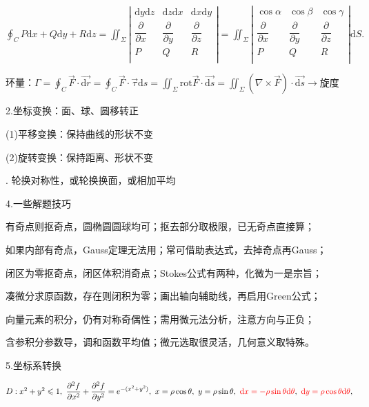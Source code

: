 \documentclass[UTF8]{ctexart}
\numberwithin{equation}{section}
\numberwithin{figure}{section}
\numberwithin{table}{section}
\newcommand\dif{\mathrm{d}}
\newcommand\no{\noindent}
\newcommand\dis{\displaystyle}
\newcommand\ls{\leqslant}
\newcommand\pfxx{\dis\frac{\partial^2 f}{\partial x^2}}
\newcommand\pfyy{\dis\frac{\partial^2 f}{\partial y^2}}
\begin{document}
\begin{spacing}{2}
\begin{enumerate}[itemindent=1.4em, label=(\arabic*)]
$\dis\oint_CP\dif x+Q\dif y+R\dif z
=\iint_\Sigma
\left|\begin{array}{ccc} 
    \dif y\dif z &    \dif z\dif x &\dif x\dif y\\ 
    \dfrac{\partial}{\partial x} &   \dfrac{\partial}{\partial y}&\dfrac{\partial}{\partial z}\\  
P&Q&R\\
\end{array}\right|
=\iint_\Sigma
\left|\begin{array}{ccc} 
    \cos\alpha &   \cos\beta &\cos\gamma \\ 
    \dfrac{\partial}{\partial x} &   \dfrac{\partial}{\partial y}&\dfrac{\partial}{\partial z}\\  
    P&Q&R\\
\end{array}\right|\dif S.
$

环量：$\dis\varGamma=
\oint_C\stackrel{\rightarrow}{F}\cdot \stackrel{\longrightarrow}{\dif r}=
\oint_C\stackrel{\rightarrow}{F}\cdot\stackrel{\rightarrow}{\tau}\dif s=
\iint_\Sigma\text{rot}\stackrel{\rightarrow}{F}\cdot\stackrel{\longrightarrow}{\dif s}
=\iint_\Sigma\left(\nabla\times\stackrel{\rightarrow}{F}\right)\cdot
\stackrel{\longrightarrow}{\dif s}
\longrightarrow$旋度

\end{enumerate}

\no2.坐标变换：面、球、圆移转正

(1)平移变换：保持曲线的形状不变

(2)旋转变换：保持距离、形状不变

\no3. \textcolor[rgb]{1,0,0}{轮换对称性}，或轮换换面，或相加平均

\no4.一些解题技巧

有奇点则抠奇点，圆椭圆圆球均可；抠去部分\textcolor[rgb]{1,0,0}{取极限}，已无奇点直接算；

如果内部有奇点，Gauss定理无法用；常可借助表达式，去掉奇点再Gauss；

闭区为零抠奇点，闭区体积消奇点；Stokes公式有两种，\textcolor[rgb]{1,0,0}{化微为一}是宗旨；

凑微分求原函数，存在则闭积为零；画出轴向辅助线，再启用Green公式；

向量元素的积分，仍有对称奇偶性；需用微元法分析，注意方向与正负；

含参积分参数导，调和函数平均值；微元选取很灵活，几何意义取特殊。

\no5.坐标系转换

$D:x^2+y^2\ls1,\ \pfxx+\pfyy=e^{-(x^2+y^2)},\ x=\rho\cos\theta,\ y=\rho\sin\theta,\ 
\textcolor[rgb]{1,0,0}{\dif x=-\rho\sin\theta\dif\theta},\ 
\textcolor[rgb]{1,0,0}{\dif y=\rho\cos\theta\dif\theta},$


\end{spacing}
\end{document}
